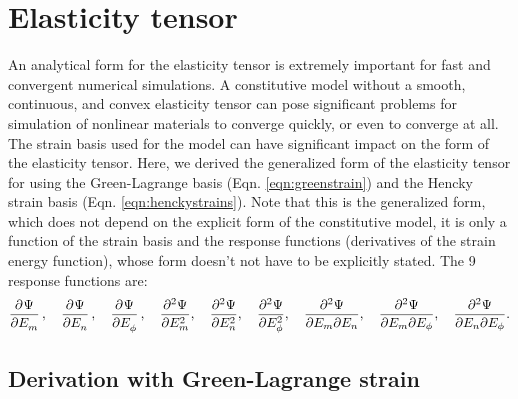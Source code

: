 \section{Elasticity tensor}\label{sec:elasticitytensor}

	An analytical form for the elasticity tensor is extremely important for fast and convergent numerical simulations. A constitutive model without a smooth, continuous, and convex elasticity tensor can pose significant problems for simulation of nonlinear materials to converge quickly, or even to converge at all. The strain basis used for the model can have significant impact on the form of the elasticity tensor. Here, we derived the generalized form of the elasticity tensor for using the Green-Lagrange basis (Eqn. \ref{eqn:greenstrain}) and the Hencky strain basis (Eqn. \ref{eqn:henckystrains}). Note that this is the generalized form, which does not depend on the explicit form of the constitutive model, it is only a function of the strain basis and the response functions (derivatives of the strain energy function), whose form doesn't not have to be explicitly stated. The 9 response functions are:
\begin{equation}
\dpd{\Psi}{E_m}, \quad \dpd{\Psi}{E_n}, \quad \dpd{\Psi}{E_\phi}, \quad \frac{\partial^2\Psi}{\partial E_m^2}, \quad \frac{\partial^2\Psi}{\partial E_n^2}, \quad \frac{\partial^2\Psi}{\partial E_\phi^2}, \quad \frac{\partial^2\Psi}{\partial E_m\partial E_n}, \quad \frac{\partial^2\Psi}{\partial E_m\partial E_\phi}, \quad \frac{\partial^2\Psi}{\partial E_n\partial E_\phi}.
\end{equation}
    
\subsection{Derivation with Green-Lagrange strain}
	
